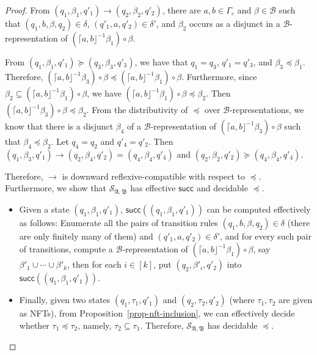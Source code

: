 \documentclass[preprint,12pt]{elsarticle}
\newcommand\Succ{\mathsf{succ}}
\newcommand\Aut{{\mathfrak{A} }}
\newcommand\AutB{{\mathfrak{B} }}
\newcommand\Tranbasis{{\mathscr{B} }}
\newcommand{\NFT}{\textsf{NFT}}
\newcommand{\wstsnodes}{\mathscr{S}}
\begin{document}
\begin{proof}
From $(q_1, \beta_1, q'_1) \rightarrow (q_2, \beta_2, q'_2)$, there are $a, b \in \Gamma_\varepsilon$ and $\beta \in \Tranbasis$ such that $(q_1, b, \beta, q_2) \in \delta$, $(q'_1, a, q'_2) \in \delta'$, and $\beta_2$ occurs as a disjunct in a $\Tranbasis$-representation of $( \lceil a, b \rfloor^{-1} \beta_1) \circ \beta$. 

From $(q_1, \beta_1, q'_1) \succeq (q_3, \beta_3, q'_3)$, we have that $q_1 = q_3$, $q'_1 = q'_3$, and $\beta_3 \preceq \beta_1$. Therefore, $ ( \lceil a, b \rfloor^{-1} \beta_3) \circ \beta \preceq ( \lceil a, b \rfloor^{-1} \beta_1) \circ \beta$. Furthermore, since $\beta_2 \subseteq ( \lceil a, b \rfloor^{-1} \beta_1) \circ \beta $, we have $( \lceil a, b \rfloor^{-1} \beta_1) \circ \beta  \preceq \beta_2$. Then $ ( \lceil a, b \rfloor^{-1} \beta_3)  \circ \beta \preceq \beta_2$. From the distributivity of $\preceq$ over $\Tranbasis$-representations, we know that there is a disjunct $\beta_4$ of a $\Tranbasis$-representation of $( \lceil a, b \rfloor^{-1} \beta_3)  \circ \beta$ such that $\beta_4 \preceq \beta_2$.
Let $q_4 = q_2$ and $q'_4= q'_2$. Then $(q_1, \beta_3, q'_1) \rightarrow (q_2, \beta_4, q'_2)=(q_4, \beta_4, q'_4)$ and $(q_2, \beta_2, q'_2) \succeq (q_4, \beta_4, q'_4)$.


Therefore, $\rightarrow$ is downward reflexive-compatible with respect to $\preceq$. Furthermore, we show that $\wstsnodes_{\Aut,\AutB}$ has effective $\Succ$ and decidable $\preceq$.
\begin{itemize}
	\item Given a state $(q_1, \beta_1, q'_1)$, $\Succ((q_1, \beta_1, q'_1))$ can be computed effectively as follows: Enumerate all the pairs of transition rules $(q_1, b, \beta, q_2) \in \delta$ (there are only finitely many of them) and $(q'_1, a, q'_2) \in \delta'$, and for every such pair of transitions, compute a $\Tranbasis$-representation of $( \lceil a, b \rfloor^{-1} \beta_1) \circ \beta$, say $\beta'_1 \cup \cdots \cup \beta'_k$, then for each $i \in [k]$, put $(q_2, \beta'_i, q'_2)$ into $\Succ((q_1, \beta_1, q'_1))$.
	\item Finally, given two states $(q_1, \tau_1, q'_1)$ and $(q_2, \tau_2, q'_2)$ (where $\tau_1, \tau_2$ are given as {\NFT}s), from Proposition~\ref{prop-nft-inclusion}, we can effectively decide whether $\tau_1 \preceq \tau_2$, namely, $\tau_2 \subseteq \tau_1$. Therefore, $\wstsnodes_{\Aut,\AutB}$ has decidable $\preceq$.
\end{itemize}


\end{proof}
\end{document}
